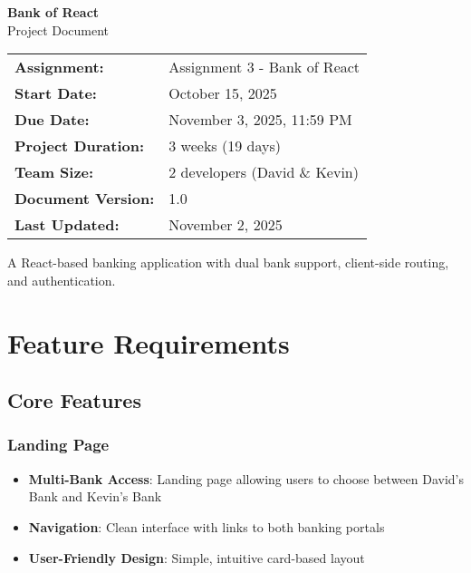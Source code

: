 \documentclass[11pt,a4paper]{article}
\begin{document}
\begin{titlepage}
\centering
\vspace*{2cm}

{\Huge\bfseries\color{bankBlue} Bank of React}\\[0.5cm]
{\Large Project Document}\\[2cm]

\begin{tabular}{ll}
\textbf{Assignment:} & Assignment 3 - Bank of React \\
\textbf{Start Date:} & October 15, 2025 \\
\textbf{Due Date:} & November 3, 2025, 11:59 PM \\
\textbf{Project Duration:} & 3 weeks (19 days) \\
\textbf{Team Size:} & 2 developers (David \& Kevin) \\
\textbf{Document Version:} & 1.0 \\
\textbf{Last Updated:} & November 2, 2025 \\
\end{tabular}

\vfill

{\large A React-based banking application with dual bank support, client-side routing, and authentication.}

\end{titlepage}

\tableofcontents
\newpage

\section{Feature Requirements}

\subsection{Core Features}

\subsubsection{Landing Page}
\begin{itemize}[leftmargin=*]
    \item \textbf{Multi-Bank Access}: Landing page allowing users to choose between David's Bank and Kevin's Bank
    \item \textbf{Navigation}: Clean interface with links to both banking portals
    \item \textbf{User-Friendly Design}: Simple, intuitive card-based layout
\end{itemize}
\end{document}
